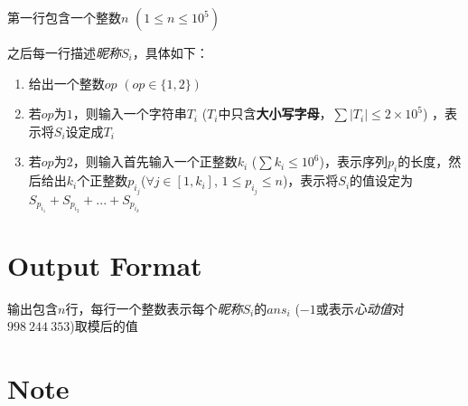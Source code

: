 \documentclass[a4paper, 12pt]{article}
\begin{document}
        第一行包含一个整数$n$
        $(1 \le n \le 10^5)$

        之后每一行描述\textit{昵称}$S_i$，具体如下：
        \begin{enumerate}
            \item
            给出一个整数$op$
            $(op \in \{1, 2\})$
            \item
            若$op$为$1$，则输入一个字符串$T_i$ ($T_i$中只含\textbf{大小写字母}，$\sum |T_i| \le 2 \times 10^5$) ，表示将$S_i$设定成$T_i$
            \item
            若$op$为$2$，则输入首先输入一个正整数$k_i$ ($\sum{k_i} \le 10^6$)，表示序列$p_i$的长度，然后给出$k_i$个正整数$p_{i_j} $($ \forall j \in [1, k_i]$, $1 \le p_{i_j} \le n$)，表示将$S_i$的值设定为$S_{p_{i_1}} + S_{p_{i_2}} + ... + S_{p_{i_k}}$
        \end{enumerate}


    \section*{Output Format}

        输出包含$n$行，每行一个整数表示每个\textit{昵称}$S_i$的$ans_i$ ($-1$或表示\textit{心动值}对$998~244~353$)取模后的值

    \section*{Note}
\end{document}
